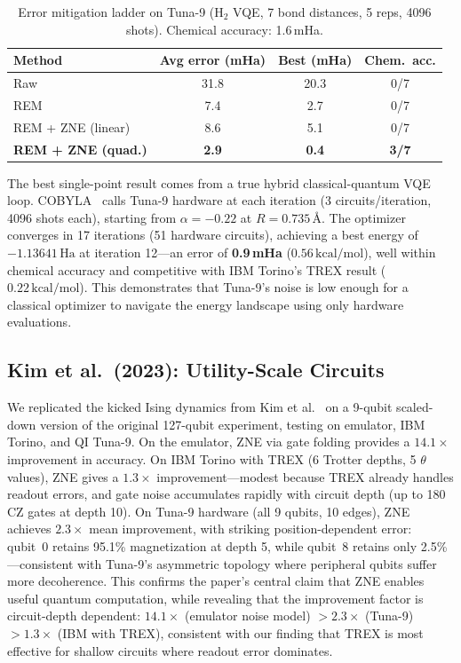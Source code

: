 \documentclass[twocolumn,prl,superscriptaddress,nofootinbib]{revtex4-2}
\newcommand{\Ha}{\,\text{Ha}}
\newcommand{\kcalmol}{\,\text{kcal/mol}}
\begin{document}
\begin{table}[h]
\caption{Error mitigation ladder on Tuna-9 (H$_2$ VQE, 7 bond distances, 5 reps, 4096 shots). Chemical accuracy: 1.6\,mHa.}
\label{tab:tuna9_mitigation}
\begin{ruledtabular}
\begin{tabular}{lccc}
Method & Avg error (mHa) & Best (mHa) & Chem.\ acc. \\
\midrule
Raw & 31.8 & 20.3 & 0/7 \\
REM & 7.4 & 2.7 & 0/7 \\
REM + ZNE (linear) & 8.6 & 5.1 & 0/7 \\
\textbf{REM + ZNE (quad.)} & \textbf{2.9} & \textbf{0.4} & \textbf{3/7} \\
\end{tabular}
\end{ruledtabular}
\end{table}

The best single-point result comes from a true hybrid classical-quantum VQE loop.
COBYLA~\cite{powell1994} calls Tuna-9 hardware at each iteration (3 circuits/iteration, 4096 shots each), starting from $\alpha = -0.22$ at $R = 0.735$\,\AA.
The optimizer converges in 17 iterations (51 hardware circuits), achieving a best energy of $-1.13641\Ha$ at iteration 12---an error of \textbf{0.9\,mHa} ($0.56\kcalmol$), well within chemical accuracy and competitive with IBM Torino's TREX result ($0.22\kcalmol$).
This demonstrates that Tuna-9's noise is low enough for a classical optimizer to navigate the energy landscape using only hardware evaluations.

\subsection{Kim et al.\ (2023): Utility-Scale Circuits}

We replicated the kicked Ising dynamics from Kim et al.~\cite{kim2023} on a 9-qubit scaled-down version of the original 127-qubit experiment, testing on emulator, IBM Torino, and QI Tuna-9.
On the emulator, ZNE via gate folding provides a $14.1\times$ improvement in accuracy.
On IBM Torino with TREX (6 Trotter depths, 5 $\theta$ values), ZNE gives a $1.3\times$ improvement---modest because TREX already handles readout errors, and gate noise accumulates rapidly with circuit depth (up to 180 CZ gates at depth 10).
On Tuna-9 hardware (all 9 qubits, 10 edges), ZNE achieves $2.3\times$ mean improvement, with striking position-dependent error: qubit~0 retains 95.1\% magnetization at depth 5, while qubit~8 retains only 2.5\%---consistent with Tuna-9's asymmetric topology where peripheral qubits suffer more decoherence.
This confirms the paper's central claim that ZNE enables useful quantum computation, while revealing that the improvement factor is circuit-depth dependent: $14.1\times$ (emulator noise model) $> 2.3\times$ (Tuna-9) $> 1.3\times$ (IBM with TREX), consistent with our finding that TREX is most effective for shallow circuits where readout error dominates.
\end{document}
